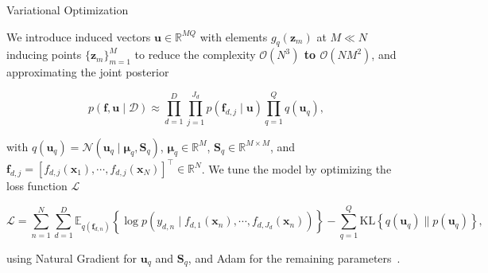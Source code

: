 \begin{frame}{Variational Optimization}

	\begin{block}{}
	We introduce induced vectors \( \mathbf{u} \in \mathbb{R}^{MQ} \) with elements \( g_q(\mathbf{z}_m) \) at	\( M \ll N \) inducing points \( \{\mathbf{z}_m\}_{m=1}^M \) to reduce the complexity \textcolor{BrandTeal}{\textbf{\(\mathcal{O}(N^3)\) to \(\mathcal{O}(NM^2)\)}}, and approximating the joint posterior
	\end{block}
	
	\[
	p(\mathbf{f},\mathbf{u}\mid \mathcal{D}) 
	\approx \prod_{d=1}^D \prod_{j=1}^{J_d} p(\mathbf{f}_{d,j}\mid \mathbf{u})
	\prod_{q=1}^Q q(\mathbf{u}_q),
	\]
	
	\begin{block}{}
		with \( q(\mathbf{u}_q)=\mathcal{N}(\mathbf{u}_q\mid \boldsymbol{\mu}_q,\mathbf{S}_q) \), \( \boldsymbol{\mu}_q \in \mathbb{R}^{M} \), \( \boldsymbol{S}_q \in \mathbb{R}^{M \times M} \), and \( \boldsymbol{f}_{d,j} = [f_{d,j}(\boldsymbol{x}_1), \cdots, f_{d,j}(\boldsymbol{x}_N) ]^\top \in \mathbb{R}^{N} \).
		We tune the model by optimizing the loss function \(\mathcal{L}\)
	\end{block}
	
	\[
	\mathcal{L} = \sum_{n=1}^{N}\sum_{d=1}^{D}
	\mathbb{E}_{q(\mathbf{f}_{d,n})}\!\left\{\log p(y_{d,n}\mid f_{d,1}(\mathbf{x}_n), \cdots, f_{d,J_d}(\mathbf{x}_n))\right\}
	- \sum_{q=1}^{Q}\mathrm{KL}\!\left\{q(\mathbf{u}_q)\parallel p(\mathbf{u}_q)\right\},
	\]
	
	\begin{block}{}
		using  Natural Gradient for \(\mathbf{u}_q\) and \(\mathbf{\boldsymbol{S}}_q\), and Adam for the remaining parameters~\cite{pmlr-v84-salimbeni18a}.
	\end{block}

\end{frame}
